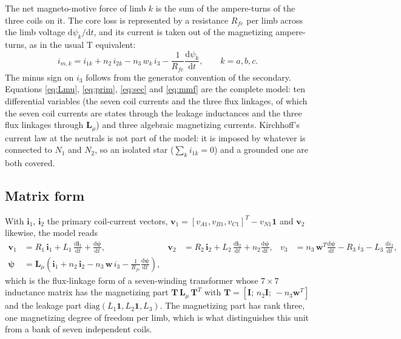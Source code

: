 \documentclass[10pt,a4paper]{scrartcl}
\newcommand{\tder}[1]{\frac{\mathrm{d}#1}{\mathrm{d}t}}
\newcommand{\vect}[1]{\boldsymbol{#1}}
\newcommand{\one}{\vect{1}}
\begin{document}
\begin{onehalfspace}
The net magneto-motive force of limb $k$ is the sum of the ampere-turns of the three coils on it. The core loss is represented by a resistance $R_{fe}$ per limb across the limb voltage $\mathrm{d}\psi_k/\mathrm{d}t$, and its current is taken out of the magnetizing ampere-turns, as in the usual T equivalent:
\begin{equation}
i_{m,k} = i_{1k} + n_2\, i_{2k} - n_3\, w_k\, i_3 - \frac{1}{R_{fe}}\tder{\psi_k}, \qquad k=a,b,c .
\label{eq:mmf}
\end{equation}
The minus sign on $i_3$ follows from the generator convention of the secondary. Equations \eqref{eq:Lmu}, \eqref{eq:prim}, \eqref{eq:sec} and \eqref{eq:mmf} are the complete model: ten differential variables (the seven coil currents and the three flux linkages, of which the seven coil currents are states through the leakage inductances and the three flux linkages through $\mathbf{L}_\mu$) and three algebraic magnetizing currents. Kirchhoff's current law at the neutrals is not part of the model: it is imposed by whatever is connected to $N_1$ and $N_2$, so an isolated star ($\sum_k i_{1k}=0$) and a grounded one are both covered.

\subsection{Matrix form}

With $\vect{i}_1$, $\vect{i}_2$ the primary coil-current vectors, $\vect{v}_1 = [v_{A1},v_{B1},v_{C1}]^T - v_{N1}\one$ and $\vect{v}_2$ likewise, the model reads
\begin{equation}
\begin{aligned}
\vect{v}_1 &= R_1\,\vect{i}_1 + L_1\,\tder{\vect{i}_1} + \tder{\vect{\psi}}, &
\vect{v}_2 &= R_2\,\vect{i}_2 + L_2\,\tder{\vect{i}_2} + n_2\tder{\vect{\psi}}, &
v_3 &= n_3\,\vect{w}^T\tder{\vect{\psi}} - R_3\,i_3 - L_3\,\tder{i_3},\\
\vect{\psi} &= \mathbf{L}_\mu\left(\vect{i}_1 + n_2\,\vect{i}_2 - n_3\,\vect{w}\,i_3 - \frac{1}{R_{fe}}\tder{\vect{\psi}}\right),
\end{aligned}
\label{eq:matrix}
\end{equation}
which is the flux-linkage form of a seven-winding transformer whose $7\times7$ inductance matrix has the magnetizing part $\mathbf{T}\,\mathbf{L}_\mu\,\mathbf{T}^T$ with $\mathbf{T}=[\mathbf{I};\, n_2\mathbf{I};\, -n_3\vect{w}^T]$ and the leakage part $\mathrm{diag}(L_1\one, L_2\one, L_3)$. The magnetizing part has rank three, one magnetizing degree of freedom per limb, which is what distinguishes this unit from a bank of seven independent coils.


\end{onehalfspace}
\end{document}
